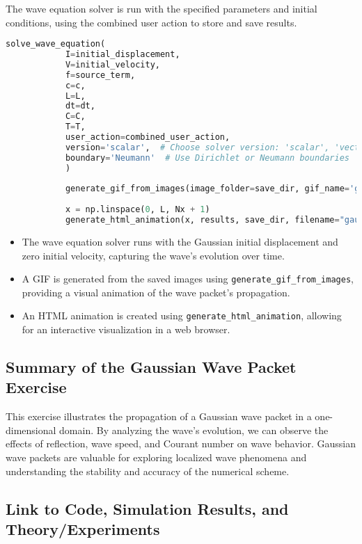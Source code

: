 \documentclass{article}
\begin{document}
		 The wave equation solver is run with the specified parameters and initial conditions, using the combined user action to store and save results.
		 
		 \begin{lstlisting}[language=Python]
		 	solve_wave_equation(
		 	I=initial_displacement,
		 	V=initial_velocity,
		 	f=source_term,
		 	c=c,
		 	L=L,
		 	dt=dt,
		 	C=C,
		 	T=T,
		 	user_action=combined_user_action,
		 	version='scalar',  # Choose solver version: 'scalar', 'vectorized', or 'vectorized2'
		 	boundary='Neumann'  # Use Dirichlet or Neumann boundaries
		 	)
		 	
		 	generate_gif_from_images(image_folder=save_dir, gif_name='gaussian_wave_animation.gif', duration=0.1)
		 	
		 	x = np.linspace(0, L, Nx + 1)
		 	generate_html_animation(x, results, save_dir, filename="gaussian_wave_animation.html")
		 \end{lstlisting}
		 
		 \begin{itemize}
		 	\item The wave equation solver runs with the Gaussian initial displacement and zero initial velocity, capturing the wave’s evolution over time.
		 	\item A GIF is generated from the saved images using \texttt{generate\_gif\_from\_images}, providing a visual animation of the wave packet’s propagation.
		 	\item An HTML animation is created using \texttt{generate\_html\_animation}, allowing for an interactive visualization in a web browser.
		 \end{itemize}
		 
		 \subsection{Summary of the Gaussian Wave Packet Exercise}
		 
		 This exercise illustrates the propagation of a Gaussian wave packet in a one-dimensional domain. By analyzing the wave’s evolution, we can observe the effects of reflection, wave speed, and Courant number on wave behavior. Gaussian wave packets are valuable for exploring localized wave phenomena and understanding the stability and accuracy of the numerical scheme.
	
		\subsection{Link to Code, Simulation Results, and Theory/Experiments}
		
\end{document}
